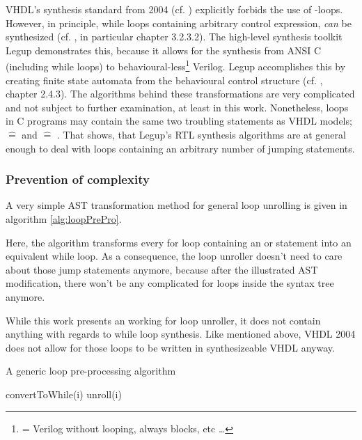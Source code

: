 VHDL's synthesis standard from 2004 (cf. \cite{IEEESYNTH})
explicitly forbids the use of -loops. However, in principle,
while loops containing arbitrary control expression, \emph{can} be
synthesized (cf. \cite{VHDLSYNTHESE}, in particular chapter
3.2.3.2). The high-level synthesis toolkit Legup
demonstrates this, because it allows for the synthesis from ANSI C
(including while loops) to behavioural-less\footnote{= Verilog without
 looping, always blocks, etc \ldots} Verilog. Legup accomplishes this by
creating finite state automata from the behavioural control structure
(cf. \cite{MSEM}, chapter 2.4.3).
The algorithms behind these transformations are very complicated and
not subject to further examination, at least in this
work. Nonetheless,  loops in C programs may contain the same two
troubling statements as VHDL models;  \(\widehat{=}\)   and 
\(\widehat{=}\) . That shows, that Legup's RTL synthesis algorithms are
at general enough to deal with loops containing an arbitrary number of
jumping statements.

\subsubsection{Prevention of complexity}
A very simple AST transformation method for general loop
unrolling is given in algorithm \ref{alg:loopPrePro}.

Here, the algorithm transforms every for loop containing an 
or  statement into an equivalent while loop. As a
consequence, the  loop unroller doesn't need to care about those
jump statements anymore, because after the illustrated AST
modification, there won't be any complicated for loops inside the
syntax tree anymore.

While this work presents an working for loop unroller, it does not
contain anything with regards to while loop synthesis. Like mentioned
above, VHDL 2004 does not allow for those loops to be written in
synthesizeable VHDL anyway.
%
\begin{algorithm}
    \caption{A generic loop pre-processing algorithm}
    \label{alg:loopPrePro}
    \begin{algorithmic}[0]
        \State convertToWhile(i)
        \Else
        \State unroll(i)
        \EndIf
        \EndFor
    \end{algorithmic}
\end{algorithm}
%
